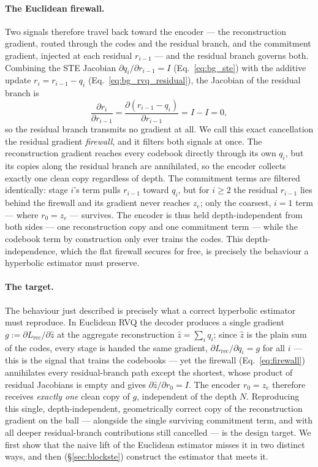 \documentclass[12pt]{report}
\begin{document}
\paragraph{The Euclidean firewall.}
Two signals therefore travel back toward the encoder --- the reconstruction gradient, routed through the codes and the residual branch, and the commitment gradient, injected at each residual $r_{i-1}$ --- and the residual branch governs both. Combining the STE Jacobian $\partial q_i/\partial r_{i-1}=I$ (Eq.~\ref{eq:bg_ste}) with the additive update $r_i = r_{i-1}-q_i$ (Eq.~\ref{eq:bg_rvq_residual}), the Jacobian of the residual branch is
\begin{equation}
    \label{eq:firewall}
    \frac{\partial r_i}{\partial r_{i-1}}
    = \frac{\partial (r_{i-1} - q_i)}{\partial r_{i-1}}
    = I - I = 0,
\end{equation}
so the residual branch transmits no gradient at all. We call this exact cancellation the residual gradient \emph{firewall}, and it filters both signals at once. The reconstruction gradient reaches every codebook directly through its own $q_i$, but its copies along the residual branch are annihilated, so the encoder collects exactly one clean copy regardless of depth. The commitment terms are filtered identically: stage $i$'s term pulls $r_{i-1}$ toward $q_i$, but for $i\ge 2$ the residual $r_{i-1}$ lies behind the firewall and its gradient never reaches $z_e$; only the coarsest, $i=1$ term --- where $r_0=z_e$ --- survives. The encoder is thus held depth-independent from both sides --- one reconstruction copy and one commitment term --- while the codebook term by construction only ever trains the codes. This depth-independence, which the flat firewall secures for free, is precisely the behaviour a hyperbolic estimator must preserve.

\paragraph{The target.}
The behaviour just described is precisely what a correct hyperbolic estimator must reproduce. In Euclidean RVQ the decoder produces a single gradient $g := \partial L_{\text{rec}}/\partial\hat z$ at the aggregate reconstruction $\hat z=\sum_i q_i$; since $\hat z$ is the plain sum of the codes, every stage is handed the same gradient, $\partial L_{\text{rec}}/\partial q_i = g$ for all $i$ --- this is the signal that trains the codebooks --- yet the firewall (Eq.~\ref{eq:firewall}) annihilates every residual-branch path except the shortest, whose product of residual Jacobians is empty and gives $\partial\hat z/\partial r_0 = I$. The encoder $r_0=z_e$ therefore receives \emph{exactly one} clean copy of $g$, independent of the depth $N$. Reproducing this single, depth-independent, geometrically correct copy of the reconstruction gradient on the ball --- alongside the single surviving commitment term, and with all deeper residual-branch contributions still cancelled --- is the design target. We first show that the naive lift of the Euclidean estimator misses it in two distinct ways, and then (\S\ref{sec:blockste}) construct the estimator that meets it.
\end{document}
